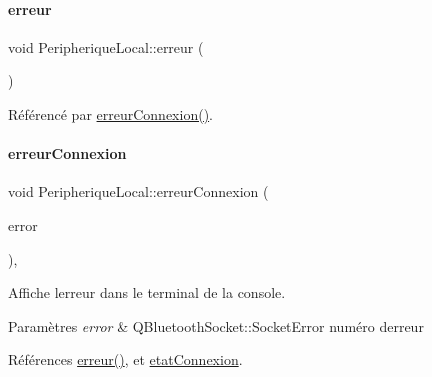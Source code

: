 \mbox{\label{class_peripherique_local_a41d9e18f2fd7e8e872db5fd3f21b11ff}} 
\paragraph{\texorpdfstring{erreur}{erreur}}
{\footnotesize\ttfamily void Peripherique\+Local\+::erreur (\begin{DoxyParamCaption}{ }\end{DoxyParamCaption})\hspace{0.3cm}{\ttfamily [signal]}}



Référencé par \hyperlink{class_peripherique_local_abb86db4a2a3d72a5de32253aa9af1ce8}{erreur\+Connexion()}.

\mbox{\label{class_peripherique_local_abb86db4a2a3d72a5de32253aa9af1ce8}} 
\paragraph{\texorpdfstring{erreur\+Connexion}{erreurConnexion}}
{\footnotesize\ttfamily void Peripherique\+Local\+::erreur\+Connexion (\begin{DoxyParamCaption}\item[{Q\+Bluetooth\+Socket\+::\+Socket\+Error}]{error }\end{DoxyParamCaption})\hspace{0.3cm}{\ttfamily [protected]}, {\ttfamily [slot]}}

Affiche l\textquotesingle{}erreur dans le terminal de la console.


\begin{DoxyParams}{Paramètres}
{\em error} & Q\+Bluetooth\+Socket\+::\+Socket\+Error numéro d\textquotesingle{}erreur \\
\hline
\end{DoxyParams}


Références \hyperlink{class_peripherique_local_a41d9e18f2fd7e8e872db5fd3f21b11ff}{erreur()}, et \hyperlink{class_peripherique_local_a5359e5a94b32b8a90c06ec999de13d2c}{etat\+Connexion}.



